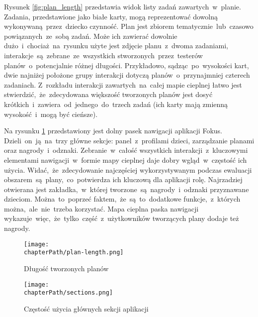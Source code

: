 Rysunek \ref{fig:plan_length} przedstawia widok listy zadań zawartych~w~planie. Zadania, przedstawione jako białe karty, mogą reprezentować dowolną wykonywaną~przez~dziecko czynność. Plan jest zbiorem tematycznie~lub~czasowo powiązanych~ze~sobą zadań. Może ich zawierać dowolnie dużo~i~chociaż~na~rysunku użyte jest zdjęcie planu~z~dwoma zadaniami, interakcje~są~zebrane~ze~wszystkich stworzonych~przez~testerów planów~o~potencjalnie różnej długości. Przykładowo, sądząc~po~wysokości kart, dwie najniżej położone grupy interakcji dotyczą planów~o~przynajmniej czterech zadaniach. Z~rozkładu interakcji zawartych~na~całej mapie cieplnej łatwo jest stwierdzić,~że~zdecydowana większość tworzonych planów jest dosyć krótkich~i~zawiera~od~jednego~do~trzech zadań (ich karty mają zmienną wysokość~i~mogą być cieńsze).

Na rysunku \ref{fig:sections_usage} przedstawiony jest dolny pasek nawigacji aplikacji Fokus. Dzieli~on~ją~na~trzy główne sekcje: panel~z~profilami dzieci, zarządzanie planami oraz nagrody~i~odznaki. Zebranie~w~całość wszystkich interakcji~z~kluczowymi elementami nawigacji~w~formie mapy cieplnej daje dobry wgląd~w~częstość ich użycia. Widać,~że~zdecydowanie najczęściej wykorzystywanym podczas ewaluacji obszarem~są~plany,~co~potwierdza ich kluczową dla aplikacji rolę. Najrzadziej otwierana jest zakładka,~w~której tworzone~są~nagrody~i~odznaki przyznawane dzieciom. Można~to~poprzeć faktem,~że~są~to~dodatkowe funkcje,~z~których można,~ale~nie~trzeba korzystać. Mapa cieplna paska nawigacji wykazuje~więc,~że~tylko~część~z~użytkowników tworzących plany dodaje też nagrody.

\bigskip
\begin{figure}[H]
\centering
\begin{minipage}{.4\textwidth}
	\centering
	\texttt{[image: \\chapterPath/plan-length.png]}
	\bigskip
	\caption{Długość tworzonych planów}
	\label{fig:plan_length}
\end{minipage}
\begin{minipage}{.55\textwidth}
	\centering
	\texttt{[image: \\chapterPath/sections.png]}
	\bigskip
	\caption{Częstość użycia głównych sekcji aplikacji}
	\label{fig:sections_usage}
\end{minipage}
\end{figure}
